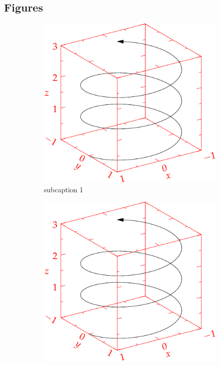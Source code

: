     \lipsum[1]

    \subsection{Figures} %
    \label{sub:figures}


    \begin{figure}
        \centering
        \begin{subfigure}[b]{0.3\textwidth}
            \centering
            \includegraphics[width=\textwidth]{images/helix.pdf}
            \caption{subcaption 1}
            \label{fig:1}
        \end{subfigure}
        \hfill
        \begin{subfigure}[b]{0.3\textwidth}
            \centering
            \includegraphics[width=\textwidth]{images/helix.pdf}

\end{subfigure}
\end{figure}
